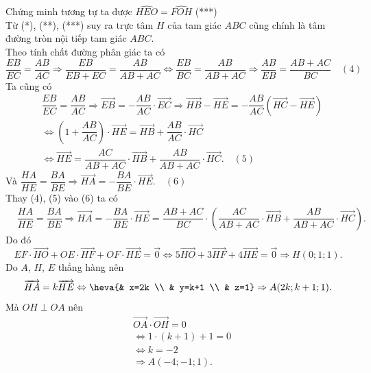 \begin{ex}
{		Chứng minh tương tự ta  được $\widehat{HEO}=\widehat{FOH}$ (***)\\
		Từ (*), (**), (***) suy ra trực tâm $H$ của tam  giác $ABC$ cũng chính là tâm đường tròn nội tiếp tam giác $ABC$.\\
		Theo  tính chất đường phân giác ta có
		 \[\dfrac{EB}{EC}=\dfrac{AB}{AC}\Rightarrow\dfrac{EB}{EB+EC}=\dfrac{AB}{AB+AC}\Leftrightarrow\dfrac{EB}{BC}=\dfrac{AB}{AB+AC}\Rightarrow\dfrac{AB}{EB}=\dfrac{AB+AC}{BC}\quad(4)\]
		Ta cũng  có
		\begin{align*}
			&\dfrac{EB}{EC}=\dfrac{AB}{AC}\Rightarrow\overrightarrow{EB}=-\dfrac{AB}{AC}\cdot\overrightarrow{EC}\Rightarrow\overrightarrow{HB}-\overrightarrow{HE}=-\dfrac{AB}{AC}\left(\overrightarrow{HC}-\overrightarrow{HE}\right)\\ 
			&\Leftrightarrow\left(1+\dfrac{AB}{AC}\right)\cdot\overrightarrow{HE}=\overrightarrow{HB}+\dfrac{AB}{AC}\cdot\overrightarrow{HC}\\ 
			 &\Leftrightarrow\overrightarrow{HE}=\dfrac{AC}{AB+AC}\cdot\overrightarrow{HB}+\dfrac{AB}{AB+AC}\cdot\overrightarrow{HC}.\quad(5)
		\end{align*}
		 Và $\dfrac{HA}{HE}=\dfrac{BA}{BE}\Rightarrow\overrightarrow{HA}=-\dfrac{BA}{BE}\cdot\overrightarrow{HE}.\quad(6)$\\
		Thay  (4), (5) vào (6) ta có
		\begin{align*}
			&\dfrac{HA}{HE}=\dfrac{BA}{BE}\Rightarrow\overrightarrow{HA}=-\dfrac{BA}{BE}\cdot\overrightarrow{HE}=\dfrac{AB+AC}{BC}\cdot\left(\dfrac{AC}{AB+AC}\cdot\overrightarrow{HB}+\dfrac{AB}{AB+AC}\cdot\overrightarrow{HC}\right). 
		\end{align*}
		Do đó 
		 \[
		EF\cdot \overrightarrow{HO} + OE\cdot \overrightarrow{HF} + OF\cdot \overrightarrow{HE} = \overrightarrow{0} 
		 \Leftrightarrow
		5\overrightarrow{HO}  + 3\overrightarrow{HF} + 4\overrightarrow{HE} = \overrightarrow{0}
		\Rightarrow 
		 H(0;1;1).
		\] 
		Do $A$, $H$,  $E$ thẳng hàng nên
		 \[
		 \overrightarrow{HA} = k\overrightarrow{HE}
		\Leftrightarrow 
		\heva{& x=2k \\ & y=k+1  \\ & z=1}
		 \Rightarrow
		A(2k;k+1;1). 
		\] 
		 Mà $OH \perp OA$ nên
		\begin{align*}
			&\overrightarrow{OA}\cdot \overrightarrow{OH}  = 0\\
			&\Leftrightarrow 
			1\cdot (k+1)  + 1 = 0\\
			&\Leftrightarrow 
			 k=-2\\
			 &\Rightarrow
			A(-4;-1;1). 

\end{align*}}
\end{ex}
